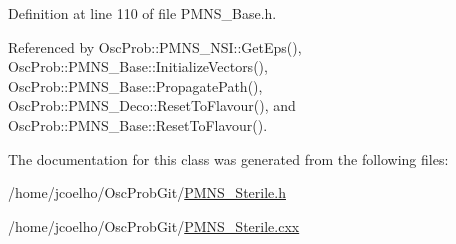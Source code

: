 Definition at line 110 of file P\+M\+N\+S\+\_\+\+Base.\+h.



Referenced by Osc\+Prob\+::\+P\+M\+N\+S\+\_\+\+N\+S\+I\+::\+Get\+Eps(), Osc\+Prob\+::\+P\+M\+N\+S\+\_\+\+Base\+::\+Initialize\+Vectors(), Osc\+Prob\+::\+P\+M\+N\+S\+\_\+\+Base\+::\+Propagate\+Path(), Osc\+Prob\+::\+P\+M\+N\+S\+\_\+\+Deco\+::\+Reset\+To\+Flavour(), and Osc\+Prob\+::\+P\+M\+N\+S\+\_\+\+Base\+::\+Reset\+To\+Flavour().



The documentation for this class was generated from the following files\+:\begin{DoxyCompactItemize}
\item 
/home/jcoelho/\+Osc\+Prob\+Git/\hyperlink{PMNS__Sterile_8h}{P\+M\+N\+S\+\_\+\+Sterile.\+h}\item 
/home/jcoelho/\+Osc\+Prob\+Git/\hyperlink{PMNS__Sterile_8cxx}{P\+M\+N\+S\+\_\+\+Sterile.\+cxx}\end{DoxyCompactItemize}
